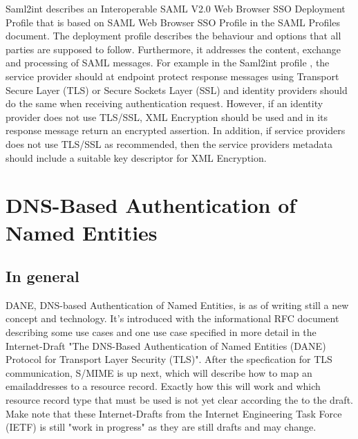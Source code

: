 Saml2int \cite{website:saml2int} describes an Interoperable SAML V2.0 Web Browser SSO Deployment Profile that is based on 
SAML Web Browser SSO Profile in the SAML Profiles document\cite{pdf:oasis-open-profiles}. 
The deployment profile describes the behaviour and options that all parties are supposed to follow. 
Furthermore, it addresses the content, exchange and processing of SAML messages.
For example in the Saml2int profile \cite{website:saml2int}, the service provider should at endpoint protect response 
messages using Transport Secure Layer (TLS) or Secure Sockets Layer (SSL)  and identity providers should do the same when receiving 
authentication request. 
However, if an identity provider does not use TLS/SSL, XML Encryption should be used and in its response message return an encrypted assertion. 
In addition, if service providers does not use TLS/SSL as recommended, then the service providers metadata should include a suitable key descriptor for XML Encryption.


\section{DNS-Based Authentication of Named Entities} 
\subsection{In general}
DANE, DNS-based Authentication of Named Entities, is as of writing still a new concept and technology.
It's introduced with the informational RFC document\cite{rfc:6394} describing some use cases and one use case specified in more detail in the Internet-Draft "The DNS-Based Authentication of Named Entities (DANE) Protocol for Transport Layer Security (TLS)"\cite{rfc:draft-dane}.
After the specfication for TLS communication, S/MIME is up next, which will describe how to map an emailaddresses to a resource record.
Exactly how this will work and which resource record type that must be used is not yet clear according the to the draft\cite{rfc:draft-smime}.
Make note that these Internet-Drafts from the Internet Engineering Task Force (IETF) is still "work in progress" as they are still drafts and may change.

